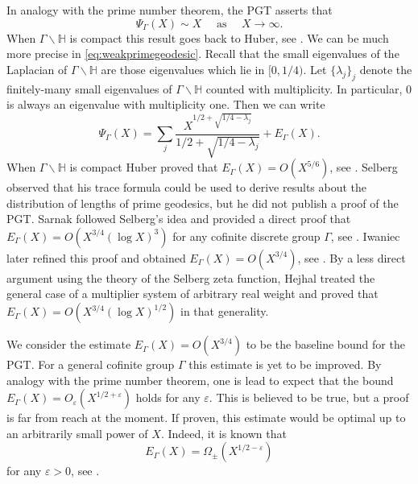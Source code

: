 \documentclass{article}
\theoremstyle{named}
\newcommand{\Hyp}{\mathbb{H}}
\begin{document}
In analogy with the prime number theorem, the PGT asserts that 
\begin{equation}\label{eq:weakprimegeodesic}
\Psi_\Gamma(X) \sim X \quad \text{ as }\quad X \to \infty.
\end{equation}
When $\Gamma\backslash \Hyp$ is compact this result goes back to Huber, see \cite[Satz 9]{huberI}. We can be much more precise in \eqref{eq:weakprimegeodesic}. Recall that the small eigenvalues of the Laplacian of $\Gamma\backslash \Hyp$ are those eigenvalues which lie in $[0, 1/4)$. Let $\{\lambda_j\}_j$ denote the finitely-many small eigenvalues of $\Gamma\backslash \Hyp$ counted with multiplicity. In particular, $0$ is always an eigenvalue with multiplicity one. Then we can write 
\begin{equation}\label{eq:primegeodesictheorem}
    \Psi_{\Gamma}(X) = \sum_{j}\frac{X^{1/2 + \sqrt{1/4 - \lambda_j}}}{1/2 + \sqrt{1/4 - \lambda_j}} +  E_{\Gamma}(X).
\end{equation}
When $\Gamma\backslash \Hyp$ is compact Huber proved that $E_\Gamma(X) = O(X^{5/6})$, see \cite[Satz III]{huberII}. Selberg observed \cite[page 179]{selberg63} that his trace formula could be used to derive results about the distribution of lengths of prime geodesics, but he did not publish a proof of the PGT. Sarnak followed Selberg's idea and provided a direct proof that $E_\Gamma(X) = O(X^{3/4}(\log X)^3)$ for any cofinite discrete group $\Gamma$, see \cite[Theorem 3.4]{sarnakthesis}. Iwaniec later refined this proof and obtained $E_\Gamma(X) = O(X^{3/4})$, see \cite[Theorem 10.5]{iwaniec}. By a less direct argument using the theory of the Selberg zeta function, Hejhal treated the general case of a multiplier system of arbitrary real weight and proved that $E_\Gamma(X) = O(X^{3/4}(\log X)^{1/2})$ \cite[Theorem 3.4]{hejhal2} in that generality. 

We consider the estimate $E_\Gamma(X) = O(X^{3/4})$ to be the baseline bound for the PGT. For a general cofinite group $\Gamma$ this estimate is yet to be improved. By analogy with the prime number theorem, one is lead to expect that the bound $E_{\Gamma}(X) = O_\varepsilon(X^{1/2 + \varepsilon})$ holds for any $\varepsilon$. This is believed to be true, but a proof is far from reach at the moment. If proven, this estimate would be optimal up to an arbitrarily small power of $X$. Indeed, it is known that 
\begin{equation*}
    E_\Gamma(X) = \Omega_{\pm}(X^{1/2-\varepsilon})
\end{equation*}
for any $\varepsilon > 0$, see \cite[note 18 in page 503]{hejhal2}. 
\end{document}
